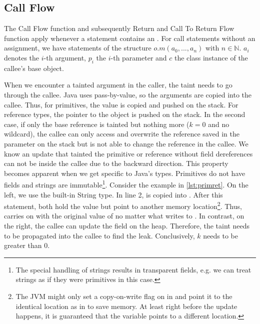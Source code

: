 \documentclass[../draft.tex]{subfiles}
\begin{document}
    \subsection{Call Flow}
    The Call Flow function and subsequently Return and Call To Return Flow function apply whenever a statement contains an .
    For call statements without an assignment, we have statements of the structure $o.m(a_0, ..., a_n)$ with $n \in \mathbb{N}$. $a_i$ denotes the $i$-th argument, $p_i$ the $i$-th parameter and $c$ the class instance of the callee's base object.

    When we encounter a tainted argument in the caller, the taint needs to go through the callee. Java uses pass-by-value, so the arguments are copied into the callee. Thus, for primitives, the value is copied and pushed on the stack. For reference types, the pointer to the object is pushed on the stack. In the second case, if only the base reference is tainted but nothing more ($k=0$ and no wildcard), the callee can only access and overwrite the reference saved in the parameter on the stack but is not able to change the reference in the callee.
    We know an update that tainted the primitive or reference without field dereferences can not be inside the callee due to the backward direction. 
    This property becomes apparent when we get specific to Java's types. Primitives do not have fields and strings are immutable\footnote{The special handling of strings results in transparent fields, e.g. we can treat strings as if they were primitives in this case.}. Consider the example in \autoref{lst:primret}. On the left, we use the built-in String type. In line 2,  is copied into . After this statement, both  hold the value  but point to another memory location\footnote{The JVM might only set a copy-on-write flag on  in  and point it to the identical location as  in  to save memory. At least right before the update happens, it is guaranteed that the variable points to a different location.}. Thus,  carries on with the original value of  no matter what  writes to . In contrast, on the right, the callee can update the field on the heap. Therefore, the taint needs to be propagated into the callee to find the leak. Conclusively, $k$ needs to be greater than $0$.
\end{document}
